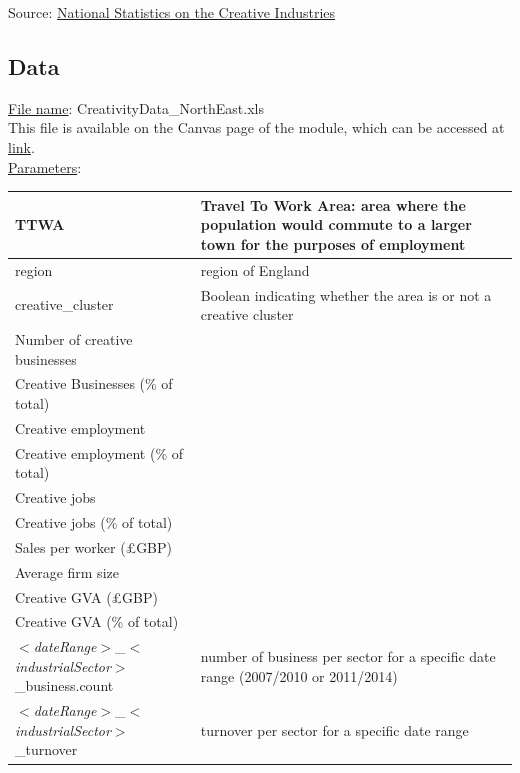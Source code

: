 \documentclass[11pt]{article}
\begin{document}
Source: \href{https://pec.ac.uk/news/national-statistics-on-the-creative-industries}{National Statistics on the Creative Industries}

\subsection*{Data}

\underline{File name}: CreativityData\_NorthEast.xls\\
This file is available on the Canvas page of the module, which can be accessed at \href{https://ncl.instructure.com/courses/49730}{link}.\\

\underline{Parameters}:
\begin{table}[h!]
    \centering
    \begin{tabular}{|l|m{8cm}|}
        \hline
        TTWA & Travel To Work Area: area where the population would commute to a larger town for the purposes of employment \\
        \hline
        region & region of England \\
        \hline
        creative\_cluster & Boolean indicating whether the area is or not a creative cluster \\
        \hline
        Number of creative businesses &  \\
        \hline
        Creative Businesses (\% of total) &  \\
        \hline
        Creative employment &  \\
        \hline
        Creative employment (\% of total) &  \\
        \hline
        Creative jobs &  \\
        \hline
        Creative jobs (\% of total) &  \\
        \hline
        Sales per worker (£GBP) &  \\
        \hline
        Average firm size &  \\
        \hline
        Creative GVA (£GBP) &  \\
        \hline
        Creative GVA (\% of total) &  \\
        \hline
        $<$\textit{dateRange}$>$\_$<$\textit{industrialSector}$>$\_business.count & number of business per sector for a specific date range (2007/2010 or 2011/2014)  \\
        \hline
        $<$\textit{dateRange}$>$\_$<$\textit{industrialSector}$>$\_turnover & turnover per sector for a specific date range \\

\end{tabular}
\end{table}
\end{document}
